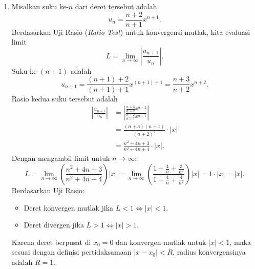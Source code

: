 \documentclass[a4paper]{article}
\begin{document}
\begin{enumerate}
\begin{enumerate}[label=(\alph*)]
                \[
                  \int_0^1 \sin(x^4) \, dx \approx 0{,}1875695.
                \]
                \textit{Catatan:} Deret ini merupakan deret bolak-balik (\textit{alternating series}) yang suku-sukunya monoton turun menuju nol. Suku ke-4 adalah $\frac{1}{146160} \approx 6{,}84 \times 10^{-6} < 0{,}0001$. Oleh karena itu, bahkan dengan menggunakan 3 suku pertama saja:
                \[
                  \frac{1}{5} - \frac{1}{78} + \frac{1}{2520} = \frac{1229}{6552} \approx 0{,}187576,
                \]
                galat aproksimasi sudah dijamin kurang dari $\frac{1}{146160} < 0{,}0001$.
        \end{enumerate}

  \item Misalkan suku ke-$n$ dari deret tersebut adalah
        \[
          u_n = \frac{n+2}{n+1} x^{n+1}.
        \]
        Berdasarkan Uji Rasio (\textit{Ratio Test}) untuk konvergensi mutlak, kita evaluasi limit
        \[
          L = \lim_{n \to \infty} \left| \frac{u_{n+1}}{u_n} \right|.
        \]
        Suku ke-$(n+1)$ adalah
        \[
          u_{n+1} = \frac{(n+1)+2}{(n+1)+1} x^{(n+1)+1} = \frac{n+3}{n+2} x^{n+2}.
        \]
        Rasio kedua suku tersebut adalah
        \begin{align*}
          \left| \frac{u_{n+1}}{u_n} \right|
           & = \left| \frac{\frac{n+3}{n+2} x^{n+2}}{\frac{n+2}{n+1} x^{n+1}} \right| \\
           & = \frac{(n+3)(n+1)}{(n+2)^2} \cdot |x|                                   \\
           & = \frac{n^2 + 4n + 3}{n^2 + 4n + 4} \cdot |x|.
        \end{align*}
        Dengan mengambil limit untuk $n \to \infty$:
        \[
          L = \lim_{n \to \infty} \left( \frac{n^2 + 4n + 3}{n^2 + 4n + 4} \right) |x| = \lim_{n \to \infty} \left( \frac{1 + \frac{4}{n} + \frac{3}{n^2}}{1 + \frac{4}{n} + \frac{4}{n^2}} \right) |x| = 1 \cdot |x| = |x|.
        \]
        Berdasarkan Uji Rasio:
        \begin{itemize}
          \item Deret konvergen mutlak jika $L < 1 \iff |x| < 1$.
          \item Deret divergen jika $L > 1 \iff |x| > 1$.
        \end{itemize}
        Karena deret berpusat di $x_0 = 0$ dan konvergen mutlak untuk $|x| < 1$, maka sesuai dengan definisi pertidaksamaan $|x - x_0| < R$, radius konvergensinya adalah $R = 1$.



\end{enumerate}
\end{document}
